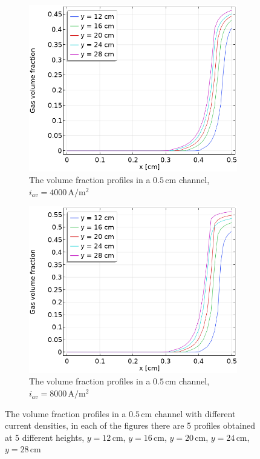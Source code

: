 \begin{figure}[H]
\begin{subfigure}{.5\textwidth}
\end{subfigure}
\begin{subfigure}{.5\textwidth}
  \centering
  \includegraphics[width=1\linewidth]{volumefractionprofilenosaff5mm4000A.png}
  \caption{The volume fraction profiles in a $0.5 \, \mathrm{cm}$ channel, $i_{av}=4000 \, \mathrm{A/m^2}$}
\end{subfigure}%
\begin{subfigure}{.5\textwidth}
  \centering
  \includegraphics[width=1\linewidth]{volumefractionprofilenosaff5mm8000A.png}
  \caption{The volume fraction profiles in a $0.5 \, \mathrm{cm}$ channel, $i_{av}=8000 \, \mathrm{A/m^2}$}
  \label{largecurrentdensity}
\end{subfigure}
\caption{The volume fraction profiles in a $0.5 \, \mathrm{cm}$ channel with different current densities, in each of the figures there are 5 profiles obtained at 5 different heights, $y = 12 \, \mathrm{cm}$, $y = 16 \, \mathrm{cm}$, $y = 20 \, \mathrm{cm}$, $y = 24 \, \mathrm{cm}$, $y = 28 \, \mathrm{cm}$}
\label{currentdensitycomparison}
\end{figure}



